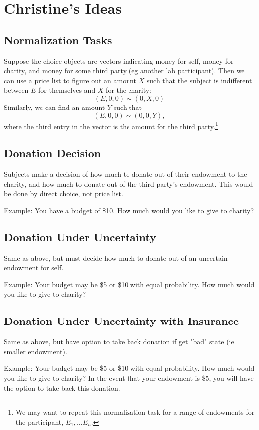\documentclass[11pt]{article}
\begin{document}
\section{Christine's Ideas}

\subsection{Normalization Tasks}

Suppose the choice objects are vectors indicating money for self, money for charity, and money for some third party (eg another lab participant).  Then we can use a price list to figure out an amount $X$ such that the subject is indifferent between $E$ for themselves and $X$ for the charity:
\[
(E, 0, 0) \sim (0,X,0)
\]
Similarly, we can find an amount $Y$ such that
\[
(E, 0, 0) \sim (0, 0, Y),
\]
where the third entry in the vector is the amount for the third party.\footnote{We may want to repeat this normalization task for a range of endowments for the participant, $E_1, \ldots E_n$.}

\subsection{Donation Decision}

Subjects make a decision of how much to donate out of their endowment to the charity, and how much to donate out of the third party's endowment.  This would be done by direct choice, not price list.

Example: You have a budget of \$10.  How much would you like to give to charity?  

\subsection{Donation Under Uncertainty}

Same as above, but must decide how much to donate out of an uncertain endowment for self.

Example: Your budget may be \$5 or \$10 with equal probability.  How much would you like to give to charity?

\subsection{Donation Under Uncertainty with Insurance}

Same as above, but have option to take back donation if get "bad" state (ie smaller endowment).

Example: Your budget may be \$5 or \$10 with equal probability.  How much would you like to give to charity?  In the event that your endowment is \$5, you will have the option to take back this donation.
\end{document}
